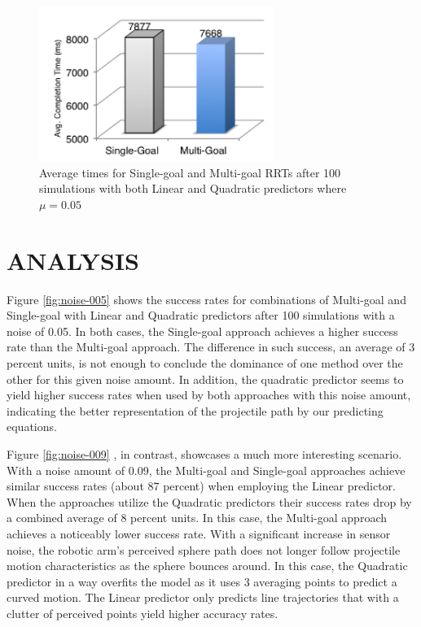 \documentclass[letterpaper, 10 pt, conference]{ieeeconf}  %
\begin{document}
\begin{figure}
        \centering
        \includegraphics[width=3in]{fig/runtimes}
        \caption{Average times for Single-goal and
        Multi-goal RRTs after 100 simulations with both Linear and
      Quadratic predictors where $\mu = 0.05$}\label{fig:runtimes}
\end{figure}




\section{ANALYSIS}

Figure \ref{fig:noise-005} shows the success rates for combinations of
Multi-goal and Single-goal with Linear and Quadratic predictors after
100 simulations with a noise of 0.05. In both cases, the Single-goal
approach achieves a higher success rate than the Multi-goal approach.
The difference in such success, an average of 3 percent units, is not
enough to conclude the dominance of one method over the other for this
given noise amount. In addition, the quadratic predictor seems to yield
higher success rates when used by both approaches with this noise
amount, indicating the better representation of the projectile path by
our predicting equations.

Figure \ref{fig:noise-009} , in contrast, showcases a much more
interesting scenario. With a noise amount of 0.09, the Multi-goal and
Single-goal approaches achieve similar success rates (about 87 percent)
when employing the Linear predictor. When the approaches utilize the
Quadratic predictors their success rates drop by a combined average of 8
percent units. In this case, the Multi-goal approach achieves a
noticeably lower success rate. With a significant increase in sensor
noise, the robotic arm’s perceived sphere path does not longer follow
projectile motion characteristics as the sphere bounces around. In this
case, the Quadratic predictor in a way overfits the model as it uses 3
averaging points to predict a curved motion. The Linear predictor only
predicts line trajectories that with a clutter of perceived points yield
higher accuracy rates.
\end{document}
